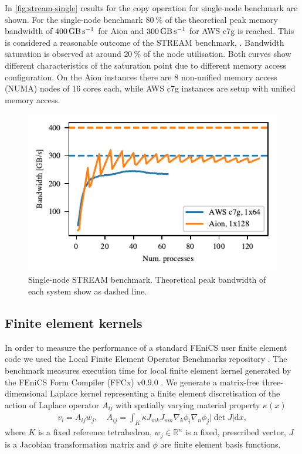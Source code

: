 In \autoref{fig:stream-single} results for the copy operation for single-node
benchmark are shown. For the single-node benchmark $\SI{80}{\percent}$ of the
theoretical peak memory bandwidth of $\SI{400}{\giga\byte\per\second}$ for Aion
and $\SI{300}{\giga\byte\per\second}$ for AWS c7g is reached. This is considered
a reasonable outcome of the STREAM benchmark, \citep{McCalpin2023}. Bandwidth
saturation is observed at around $\SI{20}{\percent}$ of the node utilisation.
Both curves show different characteristics of the saturation point due to
different memory access configuration. On the Aion instances there are 8
non-unified memory access (NUMA) nodes of 16 cores each, while AWS c7g instances
are setup with unified memory access.

\begin{figure}
\begin{center}
        \includegraphics{chapters/chp1/graphics/stream_plots/stream_single_node.pdf}
\end{center}
	\caption{Single-node STREAM benchmark. Theoretical peak bandwidth of each system show as dashed line.}
        \label{fig:stream-single}
\end{figure}

\subsection*{Finite element kernels}

In order to measure the performance of a standard FEniCS user finite element
code we used the Local Finite Element Operator Benchmarks repository
\citep{Baratta2023}. The benchmark measures execution time for local finite
element kernel generated by the FEniCS Form Compiler (FFCx) v0.9.0
\citep{kirby_compiler_2006}. We generate a matrix-free three-dimensional
Laplace kernel representing a finite element discretisation of the action of
Laplace operator $A_{ij}$ with spatially varying material property $\kappa(x)$
\begin{align}
    v_i = A_{ij} w_j, \quad
    A_{ij} = \int_K \kappa J_{mk} J_{mn} \nabla_k \phi_i \nabla_n \phi_j |\det J| \mathrm dx,
\end{align}
where $K$ is a fixed reference tetrahedron, $w_j \in \mathbb{R}^{n}$ is a
fixed, prescribed vector, $J$ is a Jacobian transformation matrix and $\phi$
are finite element basis functions.

